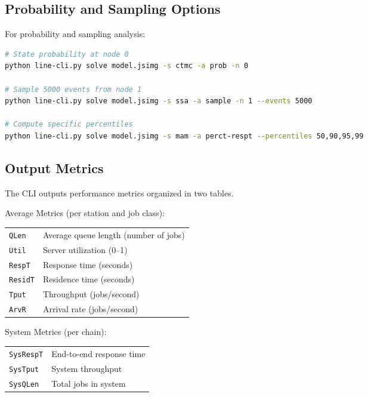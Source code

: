 \subsection{Probability and Sampling Options}
For probability and sampling analysis:
\begin{lstlisting}[language=bash, basicstyle=\ttfamily\footnotesize]
# State probability at node 0
python line-cli.py solve model.jsimg -s ctmc -a prob -n 0

# Sample 5000 events from node 1
python line-cli.py solve model.jsimg -s ssa -a sample -n 1 --events 5000

# Compute specific percentiles
python line-cli.py solve model.jsimg -s mam -a perct-respt --percentiles 50,90,95,99
\end{lstlisting}

\subsection{Output Metrics}
\label{cli-output-metrics}

The CLI outputs performance metrics organized in two tables.

Average Metrics (per station and job class):
\begin{center}
\begin{tabular}{|l|l|}
\hline
\texttt{QLen} & Average queue length (number of jobs) \\
\texttt{Util} & Server utilization (0--1) \\
\texttt{RespT} & Response time (seconds) \\
\texttt{ResidT} & Residence time (seconds) \\
\texttt{Tput} & Throughput (jobs/second) \\
\texttt{ArvR} & Arrival rate (jobs/second) \\
\hline
\end{tabular}
\end{center}

System Metrics (per chain):
\begin{center}
\begin{tabular}{|l|l|}
\hline
\texttt{SysRespT} & End-to-end response time \\
\texttt{SysTput} & System throughput \\
\texttt{SysQLen} & Total jobs in system \\
\hline
\end{tabular}
\end{center}

